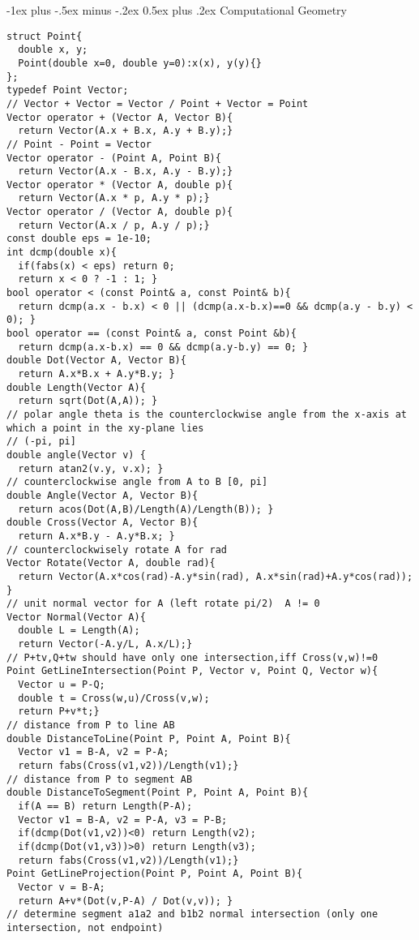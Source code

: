 \documentclass[10pt,landscape]{article}
\makeatletter
\renewcommand{\section}{\@startsection{section}{1}{0mm}%
                                {-1ex plus -.5ex minus -.2ex}%
                                {0.5ex plus .2ex}%
                                {\normalfont\large\bfseries}}
\makeatother
\begin{document}
\begin{multicols}{2}
\section{Computational Geometry}
\begin{lstlisting}
struct Point{
  double x, y;
  Point(double x=0, double y=0):x(x), y(y){}
};
typedef Point Vector;
// Vector + Vector = Vector / Point + Vector = Point
Vector operator + (Vector A, Vector B){
  return Vector(A.x + B.x, A.y + B.y);}
// Point - Point = Vector
Vector operator - (Point A, Point B){
  return Vector(A.x - B.x, A.y - B.y);}
Vector operator * (Vector A, double p){
  return Vector(A.x * p, A.y * p);}
Vector operator / (Vector A, double p){
  return Vector(A.x / p, A.y / p);}
const double eps = 1e-10;
int dcmp(double x){
  if(fabs(x) < eps) return 0;
  return x < 0 ? -1 : 1; }
bool operator < (const Point& a, const Point& b){
  return dcmp(a.x - b.x) < 0 || (dcmp(a.x-b.x)==0 && dcmp(a.y - b.y) < 0); }
bool operator == (const Point& a, const Point &b){
  return dcmp(a.x-b.x) == 0 && dcmp(a.y-b.y) == 0; }
double Dot(Vector A, Vector B){
  return A.x*B.x + A.y*B.y; }
double Length(Vector A){
  return sqrt(Dot(A,A)); }
// polar angle theta is the counterclockwise angle from the x-axis at which a point in the xy-plane lies
// (-pi, pi]
double angle(Vector v) {
  return atan2(v.y, v.x); }
// counterclockwise angle from A to B [0, pi]
double Angle(Vector A, Vector B){
  return acos(Dot(A,B)/Length(A)/Length(B)); }
double Cross(Vector A, Vector B){
  return A.x*B.y - A.y*B.x; }
// counterclockwisely rotate A for rad
Vector Rotate(Vector A, double rad){
  return Vector(A.x*cos(rad)-A.y*sin(rad), A.x*sin(rad)+A.y*cos(rad)); }
// unit normal vector for A (left rotate pi/2)  A != 0
Vector Normal(Vector A){
  double L = Length(A);
  return Vector(-A.y/L, A.x/L);}
// P+tv,Q+tw should have only one intersection,iff Cross(v,w)!=0
Point GetLineIntersection(Point P, Vector v, Point Q, Vector w){
  Vector u = P-Q;
  double t = Cross(w,u)/Cross(v,w);
  return P+v*t;}
// distance from P to line AB
double DistanceToLine(Point P, Point A, Point B){
  Vector v1 = B-A, v2 = P-A;
  return fabs(Cross(v1,v2))/Length(v1);}
// distance from P to segment AB
double DistanceToSegment(Point P, Point A, Point B){
  if(A == B) return Length(P-A);
  Vector v1 = B-A, v2 = P-A, v3 = P-B;
  if(dcmp(Dot(v1,v2))<0) return Length(v2);
  if(dcmp(Dot(v1,v3))>0) return Length(v3);
  return fabs(Cross(v1,v2))/Length(v1);}
Point GetLineProjection(Point P, Point A, Point B){
  Vector v = B-A;
  return A+v*(Dot(v,P-A) / Dot(v,v)); }
// determine segment a1a2 and b1b2 normal intersection (only one intersection, not endpoint)

\end{lstlisting}
\end{multicols}
\end{document}
